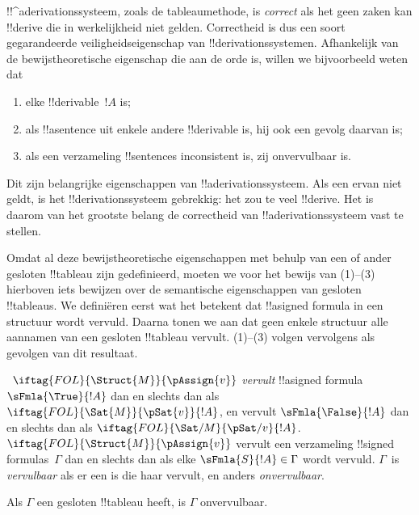 \documentclass[openany]{memoir}
\begin{document}
\begin{explain}
!!^a{derivation}ssysteem, zoals de tableaumethode, is \emph{correct}
als het geen zaken kan !!{derive} die in werkelijkheid niet gelden.
Correctheid is dus een soort gegarandeerde veiligheidseigenschap van
!!{derivation}ssystemen. Afhankelijk van de bewijstheoretische
eigenschap die aan de orde is, willen we bijvoorbeeld weten dat
\begin{enumerate}
\item elke !!{derivable}~$!A$  is;
\item als !!a{sentence} uit enkele andere !!{derivable} is, hij ook een
  gevolg daarvan is;
\item als een verzameling !!{sentence}s inconsistent is, zij
  onvervulbaar is.
\end{enumerate}
Dit zijn belangrijke eigenschappen van !!a{derivation}ssysteem. Als
een ervan niet geldt, is het !!{derivation}ssysteem gebrekkig: het zou
te veel !!{derive}. Het is daarom van het grootste belang de
correctheid van !!a{derivation}ssysteem vast te stellen.

Omdat al deze bewijstheoretische eigenschappen met behulp van een of
ander gesloten !!{tableau} zijn gedefinieerd, moeten we voor het
bewijs van (1)--(3) hierboven iets bewijzen over de semantische
eigenschappen van gesloten !!{tableau}s. We definiëren eerst wat het
betekent dat !!a{signed formula} in een structuur wordt vervuld. Daarna
tonen we aan dat geen enkele structuur alle aannamen van een gesloten
!!{tableau} vervult. (1)--(3) volgen vervolgens als gevolgen van dit
resultaat.
\end{explain}

\begin{defn}
~$\iftag{FOL}{\Struct{M}}{\pAssign{v}}$
\emph{vervult} !!a{signed formula} $\sFmla{\True}{!A}$ dan en slechts
dan als $\iftag{FOL}{\Sat{M}}{\pSat{v}}{!A}$, en vervult
$\sFmla{\False}{!A}$ dan en slechts dan als
$\iftag{FOL}{\Sat/{M}}{\pSat/{v}}{!A}$. $\iftag{FOL}{\Struct{M}}{\pAssign{v}}$
vervult een verzameling !!{signed formula}s~$\Gamma$ dan en slechts
dan als elke $\sFmla{S}{!A} \in \Gamma$ wordt vervuld. $\Gamma$~is
\emph{vervulbaar} als er een 
is die haar vervult, en anders \emph{onvervulbaar}.
\end{defn}

\begin{thm}[Correctheid]
  Als $\Gamma$ een gesloten !!{tableau} heeft, is $\Gamma$
  onvervulbaar.
\end{thm}
\end{document}
